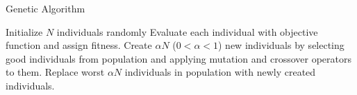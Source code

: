 \documentclass[conference]{IEEEtran}
\begin{document}
\begin{algorithm}[h]
\caption{Genetic Algorithm}
\label{alg:genetic}
\begin{algorithmic}
\STATE Initialize $N$ individuals randomly
	\STATE Evaluate each individual with objective function and assign fitness.
	\STATE Create $\alpha N$ ($0 < \alpha < 1$) new individuals by selecting good individuals from population and applying mutation and crossover operators to them.
	\STATE Replace worst $\alpha N$ individuals in population with newly created individuals.
\ENDFOR
\end{algorithmic}
\end{algorithm}



\end{document}

